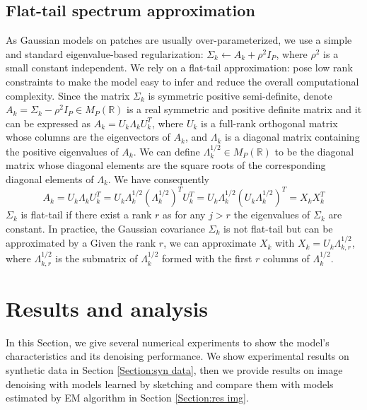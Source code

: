 \documentclass[12pt,a4paper]{article}
\begin{document}
\subsection{Flat-tail spectrum approximation}\label{Section:lowrank}
As Gaussian models on patches are usually over-parameterized, we use a simple and standard eigenvalue-based regularization: $\Sigma_k \xleftarrow{} A_k + \rho^2 I_P$, where $\rho^2$ is a small constant independent.
We rely on a flat-tail approximation: pose low rank constraints to make the model easy to infer and reduce the overall computational complexity.
Since the matrix $\Sigma_k$ is symmetric positive semi-definite, denote $A_k = \Sigma_k - \rho^2 I_P \in M_P(\mathbb{R})$ is a real symmetric and positive definite matrix and it can be expressed as $A_k = U_k \Lambda_k U_k^T$, where $U_k$ is a full-rank orthogonal matrix whose columns are the eigenvectors of $A_k$, and $\Lambda_k$ is a diagonal matrix containing the positive eigenvalues of $A_k$.
We can define $\Lambda_k^{1/2} \in M_P(\mathbb{R})$ to be the diagonal matrix whose diagonal elements are the square roots of the corresponding diagonal elements of $\Lambda_k$.
We have consequently
\begin{equation}
    A_k= U_k \Lambda_k U_k^T = U_k \Lambda_k^{1/2} (\Lambda_k^{1/2})^T U_k^T = U_k \Lambda_k^{1/2} (U_k \Lambda_k^{1/2})^T = X_k X_k^T 
\end{equation}
$\Sigma_k$ is flat-tail if there exist a rank $r$ as for any $j > r$ the eigenvalues of $\Sigma_k$ are constant. In practice, the Gaussian covariance $\Sigma_k$ is not flat-tail but can be approximated by a 
Given the rank $r$, we can approximate $X_k$ with $X_k = U_k \Lambda_{k,r}^{1/2}$, where $\Lambda_{k,r}^{1/2}$ is the submatrix of $\Lambda_k^{1/2}$ formed with the first $r$ columns of $\Lambda_k^{1/2}$.


\section{Results and analysis}
In this Section, we give several numerical experiments to show the model's characteristics and its denoising performance.
We show experimental results on synthetic data in Section \ref{Section:syn data}, then we provide results on image denoising with models learned by sketching and compare them with models estimated by EM algorithm in Section \ref{Section:res img}. 
\end{document}
